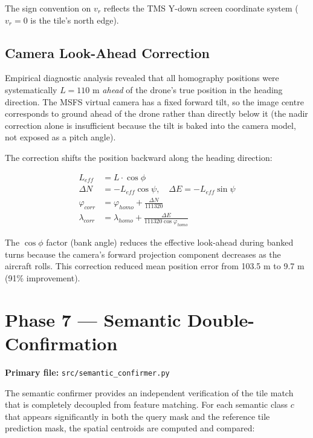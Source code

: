 \documentclass[12pt,a4paper]{article}
\begin{document}
The sign convention on $v_r$ reflects the TMS Y-down screen coordinate system
($v_r = 0$ is the tile's north edge).

\subsection{Camera Look-Ahead Correction}

Empirical diagnostic analysis revealed that all homography positions were
systematically $L = 110$ m \emph{ahead} of the drone's true position in the
heading direction. The MSFS virtual camera has a fixed forward tilt, so the
image centre corresponds to ground ahead of the drone rather than directly
below it (the nadir correction alone is insufficient because the tilt is
baked into the camera model, not exposed as a pitch angle).

The correction shifts the position backward along the heading direction:

\begin{align}
    L_{eff} &= L \cdot \cos\phi
    \label{eq:lookahead_eff} \\
    \Delta N &= -L_{eff}\cos\psi, \quad \Delta E = -L_{eff}\sin\psi
    \label{eq:lookahead_ned} \\
    \varphi_{corr} &= \varphi_{homo} + \frac{\Delta N}{111320}
    \label{eq:lookahead_lat} \\
    \lambda_{corr} &= \lambda_{homo} + \frac{\Delta E}{111320\cos\varphi_{homo}}
    \label{eq:lookahead_lon}
\end{align}

The $\cos\phi$ factor (bank angle) reduces the effective look-ahead during
banked turns because the camera's forward projection component decreases as
the aircraft rolls. This correction reduced mean position error from 103.5 m
to 9.7 m (91\% improvement).

\section{Phase 7 --- Semantic Double-Confirmation}

\noindent\textbf{Primary file:} \texttt{src/semantic\_confirmer.py}

The semantic confirmer provides an independent verification of the tile match
that is completely decoupled from feature matching. For each semantic class $c$
that appears significantly in both the query mask and the reference tile
prediction mask, the spatial centroids are computed and compared:
\end{document}
